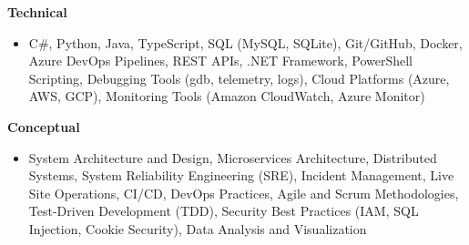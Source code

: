 \textbf{Technical}
\begin{itemize}[leftmargin=1.5em, nosep, noitemsep]
    \item[] 
    C\#,
    Python,
    Java,
    TypeScript,
    SQL (MySQL, SQLite),
    Git/GitHub,
    Docker,
    Azure DevOps Pipelines,
    REST APIs,
    .NET Framework,
    PowerShell Scripting,
    Debugging Tools (gdb, telemetry, logs),
    Cloud Platforms (Azure, AWS, GCP),
    Monitoring Tools (Amazon CloudWatch, Azure Monitor)
\end{itemize}
\textbf{Conceptual}
\begin{itemize}[leftmargin=1.5em, nosep, noitemsep]
    \item[]
    System Architecture and Design,
    Microservices Architecture,
    Distributed Systems,
    System Reliability Engineering (SRE),
    Incident Management,
    Live Site Operations,
    CI/CD,
    DevOps Practices,
    Agile and Scrum Methodologies,
    Test-Driven Development (TDD),
    Security Best Practices (IAM, SQL Injection, Cookie Security),
    Data Analysis and Visualization
\end{itemize}